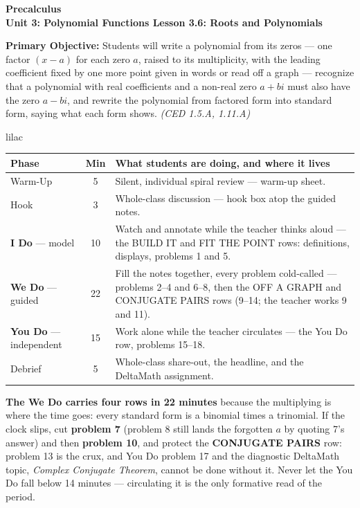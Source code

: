 \documentclass[10pt]{article}
\newcommand{\CourseName}{Precalculus}
\newcommand{\UnitNumberName}{Unit 3: Polynomial Functions \quad}
\newcommand{\LessonNumberName}{Lesson 3.6: Roots and Polynomials}
\begin{document}
\begin{center}
    {\Large\bfseries \CourseName \\
    {\small\bfseries \UnitNumberName \LessonNumberName}}
\end{center}

\begin{tcolorbox}[colback=lilac, colframe=plum, boxrule=0.9pt, arc=2mm,
    left=2mm, right=2mm, top=1.5mm, bottom=1.5mm]
    \textbf{Primary Objective:} Students will write a polynomial from its zeros --- one factor
    $(x - a)$ for each zero $a$, raised to its multiplicity, with the leading coefficient fixed
    by one more point given in words or read off a graph --- recognize that a polynomial with
    real coefficients and a non-real zero $a + bi$ must also have the zero $a - bi$, and rewrite
    the polynomial from factored form into standard form, saying what each form shows.
    \hfill\textit{\small (CED 1.5.A, 1.11.A)}
\end{tcolorbox}

\boxguard[22]
\begin{skillbox}{lilac}
\small
\renewcommand{\arraystretch}{1.25}
\begin{tabularx}{\linewidth}{@{} l c X @{}}
\textbf{Phase} & \textbf{Min} & \textbf{What students are doing, and where it lives} \\
\midrule
Warm-Up                       & 5  & Silent, individual spiral review --- warm-up sheet. \\
Hook                          & 3  & Whole-class discussion --- hook box atop the guided notes. \\
\textbf{I Do} --- model       & 10 & Watch and annotate while the teacher thinks aloud --- the BUILD IT and FIT THE POINT rows: definitions, displays, problems 1 and 5. \\
\textbf{We Do} --- guided     & 22 & Fill the notes together, every problem cold-called --- problems 2--4 and 6--8, then the OFF A GRAPH and CONJUGATE PAIRS rows (9--14; the teacher works 9 and 11). \\
\textbf{You Do} --- independent & 15 & Work alone while the teacher circulates --- the You Do row, problems 15--18. \\
Debrief                       & 5  & Whole-class share-out, the headline, and the DeltaMath assignment. \\
\end{tabularx}

\smallskip
\textbf{The We Do carries four rows in 22 minutes} because the multiplying is where the
time goes: every standard form is a binomial times a trinomial. If the clock slips, cut
\textbf{problem 7} (problem 8 still lands the forgotten $a$ by quoting 7's answer) and then
\textbf{problem 10}, and protect the \textbf{CONJUGATE PAIRS} row: problem 13 is the crux, and
You Do problem 17 and the diagnostic DeltaMath topic, \textit{Complex Conjugate Theorem}, cannot
be done without it. Never let the You Do fall below 14 minutes --- circulating it is the only
formative read of the period.
\end{skillbox}
\end{document}
